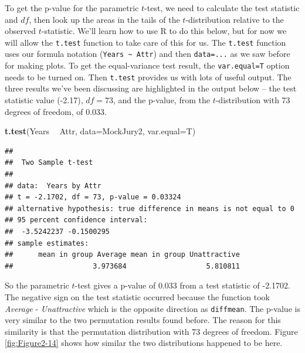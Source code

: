 \documentclass[]{book}
\newenvironment{Shaded}{\begin{snugshade}}{\end{snugshade}}
\newcommand{\KeywordTok}[1]{\textcolor[rgb]{0.13,0.29,0.53}{\textbf{#1}}}
\newcommand{\DataTypeTok}[1]{\textcolor[rgb]{0.13,0.29,0.53}{#1}}
\newcommand{\StringTok}[1]{\textcolor[rgb]{0.31,0.60,0.02}{#1}}
\newcommand{\OperatorTok}[1]{\textcolor[rgb]{0.81,0.36,0.00}{\textbf{#1}}}
\newcommand{\NormalTok}[1]{#1}
\begin{document}
To get the p-value for the parametric \(t\)-test, we need to calculate
the test statistic and \(df\), then look up the areas in the tails of
the \(t\)-distribution relative to the observed \(t\)-statistic. We'll
learn how to use R to do this below, but for now we will allow the
\texttt{t.test} function to take care of this for us. The
\texttt{t.test} function uses our formula notation
(\texttt{Years\ \textasciitilde{}\ Attr}) and then \texttt{data=...} as
we saw before for making plots. To get the equal-variance test result,
the \texttt{var.equal=T} option needs to be turned on. Then
\texttt{t.test} provides us with lots of useful output. The three
results we've been discussing are highlighted in the output below -- the
test statistic value (-2.17), \(df=73\), and the p-value, from the
\(t\)-distribution with 73 degrees of freedom, of 0.033.

\begin{Shaded}
\begin{Highlighting}[]
\KeywordTok{t.test}\NormalTok{(Years }\OperatorTok{~}\StringTok{ }\NormalTok{Attr, }\DataTypeTok{data=}\NormalTok{MockJury2, }\DataTypeTok{var.equal=}\NormalTok{T)}
\end{Highlighting}
\end{Shaded}

\begin{verbatim}
## 
##  Two Sample t-test
## 
## data:  Years by Attr
## t = -2.1702, df = 73, p-value = 0.03324
## alternative hypothesis: true difference in means is not equal to 0
## 95 percent confidence interval:
##  -3.5242237 -0.1500295
## sample estimates:
##      mean in group Average mean in group Unattractive 
##                   3.973684                   5.810811
\end{verbatim}

So the parametric \(t\)-test gives a p-value of 0.033 from a test
statistic of -2.1702. The negative sign on the test statistic occurred
because the function took \emph{Average} - \emph{Unattractive} which is
the opposite direction as \texttt{diffmean}. The p-value is very similar
to the two permutation results found before. The reason for this
similarity is that the permutation distribution with 73 degrees of
freedom. Figure \ref{fig:Figure2-14} shows how similar the two
distributions happened to be here.
\end{document}
